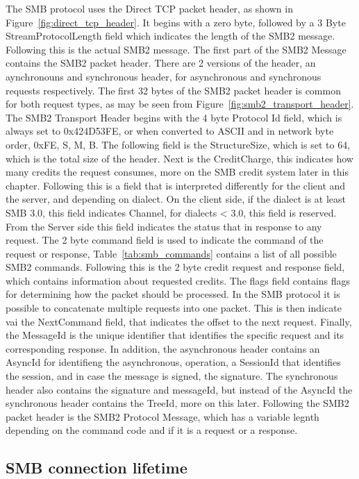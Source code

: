\documentclass[english, 12pt, a4paper, elec, utf8, a-2b, online]{aaltothesis}
\begin{document}
The SMB protocol uses the Direct TCP packet header, as shown in Figure~\ref{fig:direct_tcp_header}.
It begins with a zero byte, followed by a 3 Byte StreamProtocolLength field which
indicates the length of the SMB2 message. Following this is the actual SMB2 message.
The first part of the SMB2 Message contains the SMB2 packet header. There are 2 versions
of the header, an aynchronouns and synchronous header, for asynchronous and synchronous
requests respectively. The first 32 bytes of the SMB2 packet header is common for both
request types, as may be seen from Figure~\ref{fig:smb2_transport_header}. The SMB2 Transport
Header begins with the 4 byte Protocol Id field, which is always set to 0x424D53FE,
or when converted to ASCII and in network byte order, 0xFE, S, M, B. The following field
is the StructureSize, which is set to 64, which is the total size of the header. Next
is the CreditCharge, this indicates how many credits the request consumes, more on
the SMB credit system later in this chapter. Following this is a field that is 
interpreted differently for the client and the server, and depending on dialect.
On the client side, if the dialect is at least SMB 3.0, this field indicates Channel,
for dialects < 3.0, this field is reserved. From the Server side this field indicates
the status that in response to any request. The 2 byte command field is used to 
indicate the command of the request or response, Table~\ref{tab:smb_commands} contains
a list of all possible SMB2 commands. Following this is the 2 byte credit request and
response field, which contains information about requested credits. The flags field
contains flags for determining how the packet should be processed. In the SMB
protocol it is possible to concatenate multiple requests into one packet. This is then
indicate vai the NextCommand field, that indicates the offset to the next request.
Finally, the MessageId is the unique identifier that identifies the specific
request and its corresponding response. In addition, the asynchronous header contains an AsyncId for identifieng the asynchronous,
operation, a SessionId that identifies the session, and in case the message is signed,
the signature. The synchronous header also contains the signature and messageId, but instead
of the AsyncId the synchronous header contains the TreeId, more on this later. Following
the SMB2 packet header is the SMB2 Protocol Message, which has a variable legnth depending
on the command code and if it is a request or a response\cite{smb2_tech}.

\subsection{SMB connection lifetime}
\end{document}
